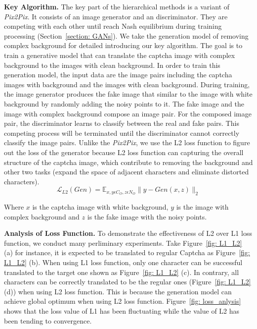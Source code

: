 \noindent \textbf{Key Algorithm.} The key part of the hierarchical methods is a variant of \emph{Pix2Pix}. It consists of an image generator and an discriminator. They are competing with each other until reach Nash equilibrium during training processing (Section~\ref{section: GANs}).
We take the generation model of removing complex background for detailed introducing our key algorithm.
The goal is to train a generative model that can translate the captcha image with complex background to the images with clean background.
In order to train this generation model, the input data are the image pairs including the captcha images with background and the images with clean background.
During training, the image generator produces the fake image that similar to the image with white background by randomly adding the noisy points to it. The fake image and the image with complex background compose an image pair.
For the composed image pair, the discriminator learns to classify between the real and fake pairs. This competing process will be terminated until the discriminator cannot correctly classify the image pairs.
Unlike the \emph{Pix2Pix}, we use the L2 loss function to figure out the loss of the generator because L2 loss function can capturing the overall structure of the captcha image, which contribute to removing the background and other two tasks (expand the space of adjacent characters and eliminate distorted characters).
\begin{equation}\label{equation: L2_loss}
    \mathcal{L}_{L2}(Gen) = \mathbb{E}_{x,y \epsilon C_{O}, z \epsilon N_{O}} \|y - Gen(x, z)\|_{2}
\end{equation}

Where $x$ is the captcha image with white background, $y$ is the image with complex background and $z$ is the fake image with the noisy points.

\noindent \textbf{Analysis of Loss Function.} To demonstrate the effectiveness of L2 over L1 loss function, we conduct many perliminary experiments. Take Figure~\ref{fig: L1_L2} (a) for instance, it is expected to be translated to regular Captcha as Figure~\ref{fig: L1_L2} (b). When using L1 loss function, only one character can be successful translated to the target one shown as Figure~\ref{fig: L1_L2} (c). In contrary, all characters can be correctly translated to be the regular ones (Figure~\ref{fig: L1_L2} (d)) when using L2 loss function. This is because the generation model can achieve global optimum when using L2 loss function. Figure~\ref{fig: loss_anlysis} shows that the loss value of L1 has been fluctuating while the value of L2 has been tending to convergence.


